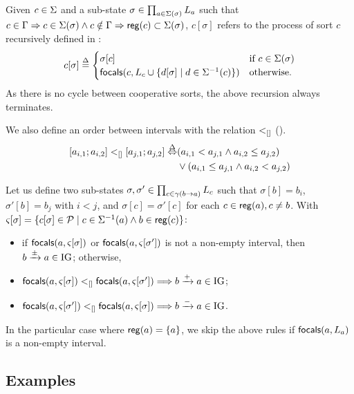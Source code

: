 
Given $c\in\Sigma$ and a sub-state $\sigma\in\prod_{a\in\Sigma(\sigma)} L_a$
such that $c\in\Gamma\Rightarrow c\in\Sigma(\sigma) \wedge
c\notin\Gamma\Rightarrow \mathsf{reg}({c})\subset\Sigma(\sigma)$,
$c[\sigma]$ refers to the process of sort $c$ recursively defined in :
\begin{equation}
c[\sigma] \stackrel{\Delta}=
\begin{cases}
\sigma[c] & \text{if } c\in\Sigma(\sigma) \\
\mathsf{focals}(c, L_c \cup \{ d[\sigma] \mid d\in\Sigma^{-1}(c) \})
	& \text{otherwise.}
\end{cases}
\label{eq:proc-ctx}
\end{equation}
As there is no cycle between cooperative sorts, the above recursion always terminates.


We also define an order between intervals with the relation $<_{[]}$
().
\begin{align}
\begin{split}
  [a_{i,1} ; a_{i,2}] <_{[]} [a_{j,1} ; a_{j,2}] \stackrel{\Delta}\Leftrightarrow & (a_{i,1} < a_{j,1} \wedge a_{i,2}
  \leq a_{j,2}) \\
  &\vee (a_{i,1} \leq a_{j,1} \wedge a_{i,2} < a_{j,2})
\end{split}
\label{eq:interval-compare}
\end{align}

Let us define two sub-states $\sigma,\sigma'\in \prod_{c\in\gamma(b\rightarrow a)} L_c$ such that
$\sigma[b]=b_i$, $\sigma'[b]=b_j$ with $i < j$,
and $\sigma[c]=\sigma'[c]$ for each $c\in\mathsf{reg}({a}), c\neq b$.
With $\varsigma[\sigma] = \{ c[\sigma] \in \mathcal{P} \mid c\in\Sigma^{-1}(a) \wedge b\in \mathsf{reg}({c})
\}$:
\begin{itemize}
\item if $\mathsf{focals}(a,\varsigma[\sigma])$ or $\mathsf{focals}(a,\varsigma[\sigma'])$ is not a non-empty interval, then
			$b\xrightarrow{\pm}a\in \mathrm{IG}$; otherwise,
\item $\mathsf{focals}(a,\varsigma[\sigma]) <_{[]} \mathsf{focals}(a,\varsigma[\sigma']) \Longrightarrow
			b\xrightarrow{+}a\in \mathrm{IG}$;
\item $\mathsf{focals}(a,\varsigma[\sigma']) <_{[]} \mathsf{focals}(a,\varsigma[\sigma]) \Longrightarrow
			b\xrightarrow{-}a\in \mathrm{IG}$.
\end{itemize}

In the particular case where $\mathsf{reg}({a})=\{a\}$,
we skip the above rules if $\mathsf{focals}(a,L_a)$ is a non-empty interval.



\subsection{Examples}


